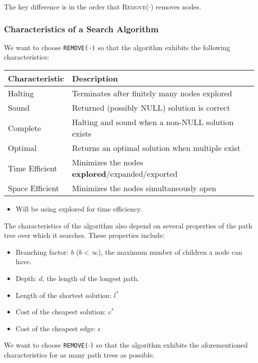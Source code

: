 \begin{warning}
    The key difference is in the order that \textsc{Remove}($\cdot$) removes nodes.
\end{warning}

\subsubsection{Characteristics of a Search Algorithm}
\begin{definition}
    We want to choose \texttt{REMOVE(·)} so that the algorithm exhibits the following characteristics:

    \begin{center}
        \begin{tabular}{|p{3cm}|p{9cm}|}
        \hline
        \textbf{Characteristic} & \textbf{Description} \\ \hline
        Halting & Terminates after finitely many nodes explored \\ \hline
        Sound & Returned (possibly NULL) solution is correct \\ \hline
        Complete & Halting and sound when a non-NULL solution exists \\ \hline
        Optimal & Returns an optimal solution when multiple exist \\ \hline
        Time Efficient & Minimizes the nodes \textbf{explored}/expanded/exported \\ \hline
        Space Efficient & Minimizes the nodes simultaneously open \\ \hline
        \end{tabular}
    \end{center}
    \vspace{1em}   
    \begin{itemize}
        \item Will be using explored for time efficiency.
    \end{itemize} 
    \vspace{1em}

    The characteristics of the algorithm also depend on several properties of the path tree over which it searches. These properties include:
    \begin{itemize}
        \item Branching factor: $b$ ($b < \infty$), the maximum number of children a node can have.
        \item Depth: $d$, the length of the longest path.
        \item Length of the shortest solution: $l^*$
        \item Cost of the cheapest solution: $c^*$
        \item Cost of the cheapest edge: $\epsilon$ 
    \end{itemize}

    We want to choose \texttt{REMOVE($\cdot$)} so that the algorithm exhibits the aforementioned characteristics for as many path trees as possible.

\end{definition}

